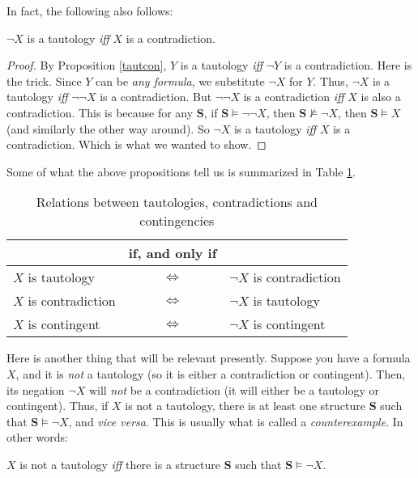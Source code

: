 In fact, the following also follows:

\begin{prop}
$\neg X$ is a tautology \textit{iff} $X$ is a contradiction. 
\end{prop}

\begin{proof}
By Proposition \ref{tautcon}, $Y$ is a tautology \textit{iff} $\neg Y$ is a contradiction. Here is the trick. Since $Y$ can be \textit{any formula}, we substitute $\neg X$ for $Y$. Thus, $\neg X$ is a tautology \textit{iff} $\neg \neg X$ is a contradiction. But $\neg \neg X$ is a contradiction \textit{iff} $X$ is also a contradiction. This is because for any $\mathbf{S}$, if $\mathbf{S} \models \neg \neg X$, then $\mathbf{S} \not\models \neg X$, then $\mathbf{S} \models X$ (and similarly the other way around). So $\neg X$ is a tautology \textit{iff} $X$ is a contradiction. Which is what we wanted to show. 
\end{proof}

Some of what the above propositions tell us is summarized in Table \ref{interrel}.

\begin{table}[h!]
\begin{center}
\begin{tabular}{lcl}
	& if, and only if & \\ \hline
	$X$ is tautology& $\Leftrightarrow$ & $\neg X$ is contradiction\\
	$X$ is contradiction& $\Leftrightarrow$ & $\neg X$ is tautology\\
	$X$ is contingent& $\Leftrightarrow$ & $\neg X$ is contingent
\end{tabular}
\end{center}
\label{interrel}
\caption{Relations between tautologies, contradictions and contingencies}
\end{table}

Here is another thing that will be relevant presently. Suppose you have a formula $X$, and it is \textit{not} a tautology (so it is either a contradiction or contingent). Then, its negation $\neg X$ will \textit{not} be a contradiction (it will either be a tautology or contingent). Thus, if $X$ is not a tautology, there is at least one structure $\mathbf{S}$ such that $\mathbf{S} \models \neg X$, and \textit{vice versa}. This is usually what is called a \textit{counterexample}. In other words:

\begin{prop}
$X$ is not a tautology \textit{iff} there is a structure $\mathbf{S}$ such that $\mathbf{S} \models \neg X$. 
\end{prop}

